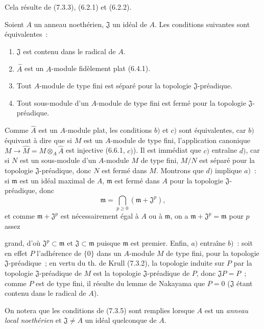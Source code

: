 Cela résulte de (7.3.3), (6.2.1) et (6.2.2).

\begin{corollary}[7.3.5]
\label{0.7.3.5-fr}
Soient $A$ un anneau noethérien, $\mathfrak J$ un idéal de $A$. Les
conditions suivantes sont équivalentes~:
\begin{enumerate}
  \item[$a)$] $\mathfrak J$ est contenu dans le radical de $A$.
  \item[$b)$] $\widehat A$ est un $A$-module fidèlement plat (6.4.1).
  \item[$c)$] Tout $A$-module de type fini est séparé pour la topologie
  $\mathfrak J$-préadique.
  \item[$d)$] Tout sous-module d'un $A$-module de type fini est fermé pour la
  topologie $\mathfrak J$-préadique.
\end{enumerate}
\end{corollary}

Comme $\widehat A$ est un $A$-module plat, les conditions $b)$ et $c)$ sont
équivalentes, car $b)$ équivaut à dire que si $M$ est un $A$-module de type
fini, l'application canonique
$M\to\widehat M=M\otimes_A\widehat A$ est injective (6.6.1, $c)$). Il est
immédiat que $c)$ entraîne $d)$, car si $N$ est un sous-module d'un $A$-module
$M$ de type fini, $M/N$ est séparé pour la topologie $\mathfrak J$-préadique,
donc $N$ est fermé dans $M$. Montrons que $d)$ implique $a)$~: si
$\mathfrak m$ est un idéal maximal de $A$, $\mathfrak m$ est fermé dans $A$
pour la topologie $\mathfrak J$-préadique, donc
\[
  \mathfrak m=\bigcap_{p\geq0}(\mathfrak m+\mathfrak J^p),
\]
et comme $\mathfrak m+\mathfrak J^p$ est nécessairement égal à $A$ ou à
$\mathfrak m$, on a $\mathfrak m+\mathfrak J^p=\mathfrak m$ pour $p$ assez


grand, d'où $\mathfrak J^p\subset\mathfrak m$ et
$\mathfrak J\subset\mathfrak m$ puisque $\mathfrak m$ est premier. Enfin,
$a)$ entraîne $b)$~: soit en effet $P$ l'adhérence de $\{0\}$ dans un
$A$-module $M$ de type fini, pour la topologie $\mathfrak J$-préadique~; en
vertu du th. de Krull (7.3.2), la topologie induite sur $P$ par la topologie
$\mathfrak J$-préadique de $M$ est la topologie $\mathfrak J$-préadique de
$P$, donc $\mathfrak JP=P$~; comme $P$ est de type fini, il résulte du lemme
de Nakayama que $P=0$ ($\mathfrak J$ étant contenu dans le radical de $A$).

On notera que les conditions de (7.3.5) sont remplies lorsque $A$ est un
\emph{anneau local noethérien} et $\mathfrak J\neq A$ un idéal quelconque de
$A$.

